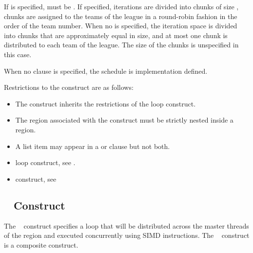 {{{{If  is specified,  must be . If specified, iterations are 
divided into chunks of size , chunks are assigned to the teams of the league in 
a round-robin fashion in the order of the team number. When no  is specified, 
the iteration space is divided into chunks that are approximately equal in size, and at 
most one chunk is distributed to each team of the league. The size of the 
chunks is unspecified in this case.

When no  clause is specified, the schedule is implementation defined.

\restrictions
Restrictions to the  construct are as follows:

\begin{itemize}
\item The  construct inherits the restrictions of the loop construct.

\item The region associated with the  construct must be
strictly nested inside a  region.

\item A list item may appear in a  or  clause but not both.
\end{itemize}

\crossreferences
\begin{itemize}
\item loop construct, see 
.

\item {} construct, see 
\end{itemize}










\subsection{~ Construct}
\label{subsec:distribute simd Construct}
\summary
The ~ construct specifies a loop that will be distributed across the 
master threads of the  region and executed concurrently using SIMD instructions. The ~ construct is a composite construct.

}}}}
